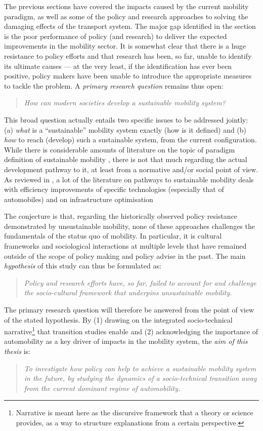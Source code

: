 The previous sections have covered the impacts caused by the current mobility paradigm, as well as some of the policy and research approaches to solving the damaging effects of the transport system. The major gap identified in the  section is the poor performance of policy (and research) to deliver the expected improvements in the mobility sector. It is somewhat clear that there is a huge resistance to policy efforts and that research has been, so far, unable to identify its ultimate causes --- at the very least, if the identification has ever been positive, policy makers have been unable to introduce the appropriate measures to tackle the problem. A \emph{primary research question} remains thus open:
\blockquote{\emph{How can modern societies develop a sustainable mobility system?}}

This broad question actually entails two specific issues to be addressed jointly: (a) \emph{what} is a ``sustainable'' mobility system exactly (how is it defined) and (b) \emph{how} to reach (develop) such a sustainable system, from the current configuration. While there is considerable amounts of literature on the topic of paradigm definition of sustainable mobility \parencite[see, e.g.,]{banister2000_Europeantransportpolicy,banister2008_sustainablemobilityparadigm,hoeyer2000_SustainableTourismSustainable,burns2013_Sustainablemobilityvision}, there is not that much regarding the actual development pathway to it, at least from a normative and/or social point of view. As reviewed in , a lot of the literature on pathways to sustainable mobility deals with efficiency improvements of specific technologies (especially that of automobiles) and on infrastructure optimisation \parencite{creutzig2015_EvolvingNarrativesLow,koehler2009_transitionsmodelsustainable,lyons2012_VisionsFutureNeed}

The conjecture is that, regarding the historically observed policy resistance demonstrated by unsustainable mobility, none of these approaches challenges the fundamentals of the status quo of mobility. In particular, it is cultural frameworks and sociological interactions at multiple levels that have remained outside of the scope of policy making and policy advise in the past. The main \emph{hypothesis} of this study can thus be formulated as:
\blockquote{\emph{Policy and research efforts have, so far, failed to account for and challenge the socio-cultural framework that underpins unsustainable mobility.}}

The primary research question will therefore be answered from the point of view of the stated hypothesis. By (1) drawing on the integrated socio-technical narrative\footnote{Narrative is meant here as the discursive framework that a theory or science provides, as a way to structure explanations from a certain perspective.} that transition studies enable and (2) acknowledging the importance of automobility as a key driver of impacts in the mobility system, the \emph{aim of this thesis} is:
\blockquote{\emph{To investigate how policy can help to achieve a sustainable mobility system in the future, by studying the \emph{dynamics} of a \emph{socio-technical} \emph{transition} away from the current dominant regime of automobility.}}

